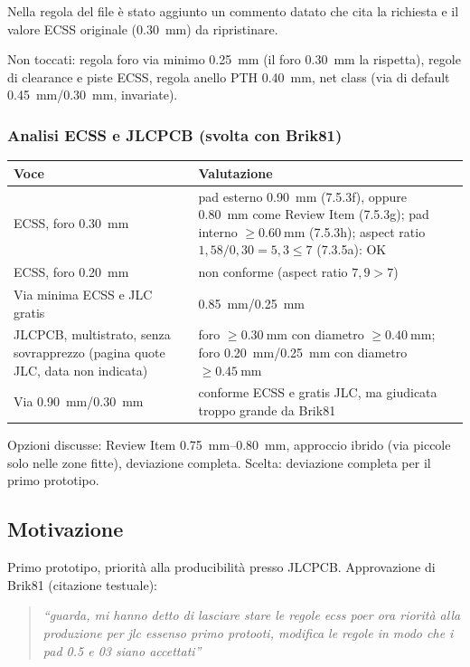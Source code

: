Nella regola del file  \`e stato aggiunto un commento datato che cita la richiesta e il valore ECSS originale (\SI{0,30}{\milli\metre}) da ripristinare.

Non toccati: regola foro via minimo \SI{0,25}{\milli\metre} (il foro \SI{0,30}{\milli\metre} la rispetta), regole di clearance e piste ECSS, regola anello PTH \SI{0,40}{\milli\metre}, net class (via di default \SI{0,45}{\milli\metre}/\SI{0,30}{\milli\metre}, invariate).

\subsubsection*{Analisi ECSS e JLCPCB (svolta con Brik81)}
\begin{center}
\small
\begin{tabularx}{\linewidth}{@{}l X@{}}
\toprule
Voce & Valutazione\\
\midrule
ECSS, foro \SI{0,30}{\milli\metre} & pad esterno \SI{0,90}{\milli\metre} (7.5.3f), oppure \SI{0,80}{\milli\metre} come Review Item (7.5.3g); pad interno $\ge\SI{0,60}{\milli\metre}$ (7.5.3h); aspect ratio $1{,}58/0{,}30=5{,}3\le 7$ (7.3.5a): OK\\
ECSS, foro \SI{0,20}{\milli\metre} & non conforme (aspect ratio $7{,}9>7$)\\
Via minima ECSS e JLC gratis & \SI{0,85}{\milli\metre}/\SI{0,25}{\milli\metre}\\
JLCPCB, multistrato, senza sovrapprezzo (pagina quote JLC, data non indicata) & foro $\ge\SI{0,30}{\milli\metre}$ con diametro $\ge\SI{0,40}{\milli\metre}$; foro \SI{0,20}{\milli\metre}/\SI{0,25}{\milli\metre} con diametro $\ge\SI{0,45}{\milli\metre}$\\
Via \SI{0,90}{\milli\metre}/\SI{0,30}{\milli\metre} & conforme ECSS e gratis JLC, ma giudicata troppo grande da Brik81\\
\bottomrule
\end{tabularx}
\end{center}
Opzioni discusse: Review Item \SIrange{0,75}{0,80}{\milli\metre}, approccio ibrido (via piccole solo nelle zone fitte), deviazione completa. Scelta: deviazione completa per il primo prototipo.

\subsection{Motivazione}
Primo prototipo, priorit\`a alla producibilit\`a presso JLCPCB. Approvazione di Brik81 (citazione testuale):
\begin{quote}
\emph{``guarda, mi hanno detto di lasciare stare le regole ecss poer ora riorità alla produzione per jlc essenso primo protooti, modifica le regole in modo che i pad 0.5 e 03 siano accettati''}
\end{quote}

